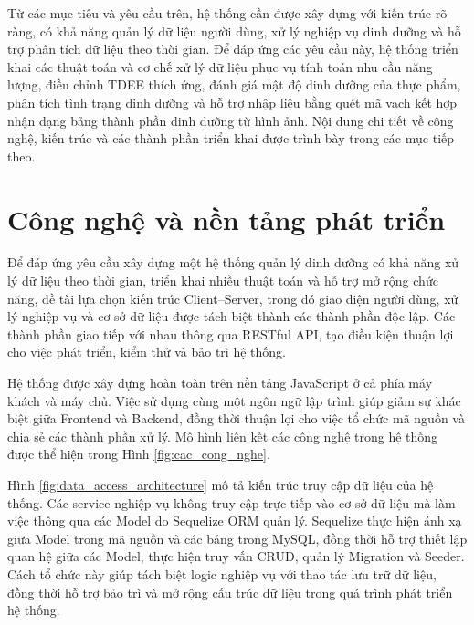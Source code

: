 \documentclass[12pt, a4paper]{report}
\begin{document}
Từ các mục tiêu và yêu cầu trên, hệ thống cần được xây dựng với kiến trúc rõ ràng, có khả năng quản lý dữ liệu người dùng, xử lý nghiệp vụ dinh dưỡng và hỗ trợ phân tích dữ liệu theo thời gian. Để đáp ứng các yêu cầu này, hệ thống triển khai các thuật toán và cơ chế xử lý dữ liệu phục vụ tính toán nhu cầu năng lượng, điều chỉnh TDEE thích ứng, đánh giá mật độ dinh dưỡng của thực phẩm, phân tích tình trạng dinh dưỡng và hỗ trợ nhập liệu bằng quét mã vạch kết hợp nhận dạng bảng thành phần dinh dưỡng từ hình ảnh. Nội dung chi tiết về công nghệ, kiến trúc và các thành phần triển khai được trình bày trong các mục tiếp theo.

\section{Công nghệ và nền tảng phát triển}Để đáp ứng yêu cầu xây dựng một hệ thống quản lý dinh dưỡng có khả năng xử lý dữ liệu theo thời gian, triển khai nhiều thuật toán và hỗ trợ mở rộng chức năng, đề tài lựa chọn kiến trúc Client–Server, trong đó giao diện người dùng, xử lý nghiệp vụ và cơ sở dữ liệu được tách biệt thành các thành phần độc lập. Các thành phần giao tiếp với nhau thông qua RESTful API, tạo điều kiện thuận lợi cho việc phát triển, kiểm thử và bảo trì hệ thống.

Hệ thống được xây dựng hoàn toàn trên nền tảng JavaScript ở cả phía máy khách và máy chủ. Việc sử dụng cùng một ngôn ngữ lập trình giúp giảm sự khác biệt giữa Frontend và Backend, đồng thời thuận lợi cho việc tổ chức mã nguồn và chia sẻ các thành phần xử lý. Mô hình liên kết các công nghệ trong hệ thống được thể hiện trong Hình \ref{fig:cac_cong_nghe}.

Hình \ref{fig:data_access_architecture} mô tả kiến trúc truy cập dữ liệu của hệ thống. Các service nghiệp vụ không truy cập trực tiếp vào cơ sở dữ liệu mà làm việc thông qua các Model do Sequelize ORM quản lý. Sequelize thực hiện ánh xạ giữa Model trong mã nguồn và các bảng trong MySQL, đồng thời hỗ trợ thiết lập quan hệ giữa các Model, thực hiện truy vấn CRUD, quản lý Migration và Seeder. Cách tổ chức này giúp tách biệt logic nghiệp vụ với thao tác lưu trữ dữ liệu, đồng thời hỗ trợ bảo trì và mở rộng cấu trúc dữ liệu trong quá trình phát triển hệ thống.
\end{document}

